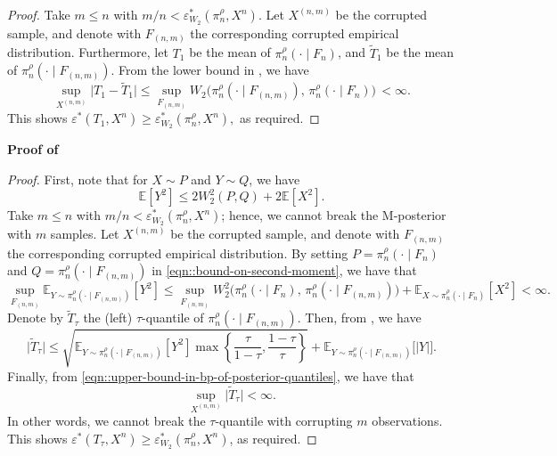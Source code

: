 \documentclass[11pt, oneside]{amsart}
\theoremstyle{definition}   %
\newcommand{\E}{\mathbb{E}}
\newcommand{\loss}{\rho}
\newcommand{\mposterior}{\pi_n^{\loss}}
\newcommand{\corruptedsample}{X^{(n,m)}}
\begin{document}
\begin{proof}
    Take \( m \leq n\) with \( m/n < \varepsilon^*_{W_2}(\pi^\rho_n, X^n).\) Let \( \corruptedsample\) be the corrupted sample, and denote with \( F_{(n,m)}\) the corresponding corrupted empirical distribution. Furthermore, let \( T_1\) be the mean of \(\mposterior(\cdot \mid F_n)\), and \( \widetilde T_1\) be the mean of \(\mposterior(\cdot \mid F_{(n,m)})\). From the lower bound in , we have
    \[
        \sup_{\corruptedsample} \bigl | T_1 - \widetilde T_1 \bigr | 
        \leq
        \sup_{F_{(n,m)}} W_2 \bigr (\mposterior(\cdot \mid F_{(n,m)}), \, \mposterior(\cdot \mid F_n) \bigl )
        \, <
        \infty.
    \]
    This shows \( \varepsilon^*(T_1, X^n) \geq \varepsilon^*_{W_2}(\pi^\rho_n, X^n),\) as required.
\end{proof}
%
%
%
\noindent \textbf{Proof of }

\begin{proof}
    First, note that for \( X \sim P\) and \( Y \sim Q\), we have
    \begin{equation}
    \label{eqn::bound-on-second-moment}
        \E[Y^2] \leq 2 W_2^2(P, Q) +2\E[X^2].
    \end{equation}
    Take \( m \leq n\) with \( m/n < \varepsilon^*_{W_2}(\pi^\rho_n, X^n)\); hence, we cannot break the M-posterior with \( m \) samples. Let \( \corruptedsample\) be the corrupted sample, and denote with \( F_{(n,m)}\) the corresponding corrupted empirical distribution. By setting \( P= \mposterior(\cdot \mid F_n)\) and \( Q= \mposterior(\cdot \mid F_{(n,m)})\) in \eqref{eqn::bound-on-second-moment}, we have that
    \begin{equation}
    \label{eqn::upper-bound-in-bp-of-posterior-quantiles}
        \sup_{F_{(n,m)}} \E_{Y \sim \mposterior(\cdot \mid F_{(n,m)})}  [ Y^2  ]
        \leq
        \sup_{F_{(n,m)}} W_2^2 \bigl ( \mposterior(\cdot \mid F_n) , \, \mposterior(\cdot \mid F_{(n,m)}) \bigr ) + \E_{X \sim \mposterior(\cdot \mid F_n)}  [ X^2 ] 
        <
        \infty.
    \end{equation}
    Denote by \( \widetilde T_\tau \) the (left) \( \tau \)-quantile of \( \mposterior(\cdot \mid F_{(n,m)})\). Then, from , we have
    \[
        \bigl | \widetilde T_\tau \bigr | 
        \leq 
        \sqrt{  \E_{Y \sim \mposterior(\cdot \mid F_{(n,m)})}  [ Y^2 ] \max\left \{ \frac{\tau}{1-\tau}, \frac{1 - \tau}{\tau} \right \}} + \E_{Y \sim \mposterior(\cdot \mid F_{(n,m)})} \bigl [ |Y| \bigr ].
    \]
    Finally, from \eqref{eqn::upper-bound-in-bp-of-posterior-quantiles}, we have that
    \[
        \sup_{\corruptedsample} \bigl | \widetilde T_\tau \bigr | < \infty.
    \]
    In other words, we cannot break the \( \tau\)-quantile with corrupting \( m\) observations. This shows \( \varepsilon^*(T_\tau, X^n) \geq \varepsilon^*_{W_2}(\pi^\rho_n, X^n) \), as required.
\end{proof}
%
%
%
%
\end{document}
